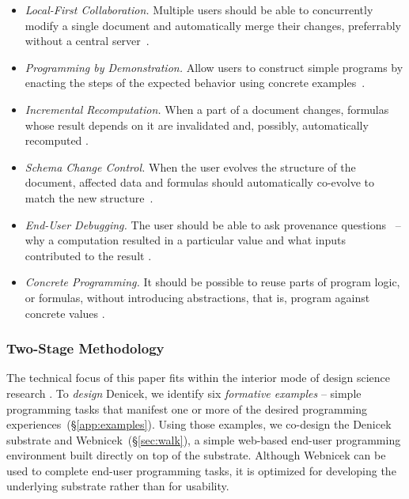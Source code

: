\documentclass[sigconf,anonymous,screen]{acmart}
\begin{document}
\begin{itemize}
\item \emph{Local-First Collaboration.} Multiple users should be able to concurrently
  modify a single document and automatically merge their changes, preferrably without a central server~\cite{kleppmann-2019-local,litt-2022-peritext}.
\item \emph{Programming by Demonstration.} Allow users to construct simple programs by
  enacting the steps of the expected behavior using concrete examples~\cite{leiva-2021-rapido,cypher-1993-pbd}.
\item \emph{Incremental Recomputation.} When a part of a document changes, formulas whose result
  depends on it are invalidated and, possibly, automatically recomputed \cite{teitelbaum-1981-cps,mcdirmid-2013-usable,horowitz-2023-engraft}.
\item \emph{Schema Change Control.} When the user evolves the structure of the document, affected
  data and formulas should automatically co-evolve to match the new structure~\cite{litt-2020-cambria,edwards-2025-schema}.
\item \emph{End-User Debugging.} The user should be able to ask provenance questions~\cite{cheney-2009-provenance} --
  why a computation resulted in a particular value and what inputs contributed to the result \cite{ko-2009-whyline}.
\item \emph{Concrete Programming.} It should be possible to reuse parts of program logic, or formulas,
  without introducing abstractions, that is, program against concrete values \cite{edwards-2006-copypaste,edwards-2022-copypaste}.
\end{itemize}

\subsubsection*{Two-Stage Methodology}
The technical focus of this paper fits within the interior mode of design science research \cite{adam-2021-dsr}.
To \emph{design} Denicek, we identify six \emph{formative examples} -- simple programming
tasks that manifest one or more of the desired programming experiences~(\S\ref{app:examples}).
Using those examples, we co-design the Denicek substrate and Webnicek~(\S\ref{sec:walk}),
a simple web-based end-user programming environment built directly on top of the substrate. Although Webnicek can
be used to complete end-user programming tasks, it is optimized for developing the underlying
substrate rather than for usability.
\end{document}
